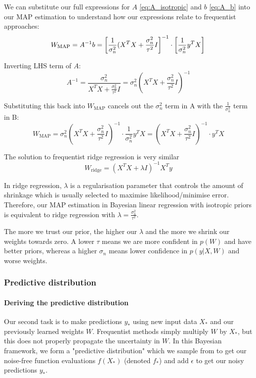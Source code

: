 \documentclass[10pt]{article}
\begin{document}
We can substitute our full expressions for $A$ \ref{eq:A_isotropic} and $b$ \ref{eq:A_b} into our MAP estimation to understand how our expressions relate to frequentist approaches:
\begin{equation*} 
    W_{\text{MAP}} = A^{-1}b = \left[\frac{1}{\sigma_n^2}(X^TX + \frac{\sigma_n^2}{\tau^2}I\right]^{-1} \cdot \left[\frac{1}{\sigma_n^2}y^TX\right] \\
\end{equation*}

Inverting LHS term of $A$:
\begin{equation*}
    A^{-1} = \frac{\sigma_n^2}{X^TX + \frac{\sigma_n^2}{\tau^2}I} = \sigma_n^2\left(X^TX + \frac{\sigma_n^2}{\tau^2}I\right)^{-1}
\end{equation*}

Substituting this back into $W_\text{MAP}$ cancels out the $\sigma_n^2$ term in A with the $\frac{1}{\sigma_n^2}$ term in B:
\begin{equation*}
    W_{\text{MAP}} = \sigma_n^2\left(X^TX + \frac{\sigma_n^2}{\tau^2}I\right)^{-1} \cdot \frac{1}{\sigma_n^2}y^TX = \left(X^TX + \frac{\sigma_n^2}{\tau^2}I\right)^{-1} \cdot y^TX
\end{equation*}

The solution to frequentist ridge regression is very similar
\begin{equation*}
    W_{\text{ridge}} = \left(X^TX + \lambda I\right)^{-1}X^Ty
\end{equation*}

In ridge regression, $\lambda$ is a regularisation parameter that controls the amount of shrinkage which is usually selected to maximise likelihood/minimise error. Therefore, our MAP estimation in Bayesian linear regression with isotropic priors is equivalent to ridge regression with $\lambda = \frac{\sigma_n^2}{\tau^2}$. 

The more we trust our prior, the higher our $\lambda$ and the more we shrink our weights towards zero. A lower $\tau$ means we are more confident in $p(W)$ and have better priors, whereas a higher $\sigma_n$ means lower confidence in $p(y|X,W)$ and worse weights.
        
\subsubsection{Predictive distribution}
\paragraph{Deriving the predictive distribution}
Our second task is to make predictions $y_*$ using new input data $X_*$ and our previously learned weights $W$. Frequentist methods simply multiply $\hat{W}$ by $X_*$, but this does not properly propagate the uncertainty in $W$. In this Bayesian framework, we form a "predictive distribution" which we sample from to get our noise-free function evaluations $f(X_*)$ (denoted $f_*$) and add $\epsilon$ to get our noisy predictions $y_*$.
\end{document}
